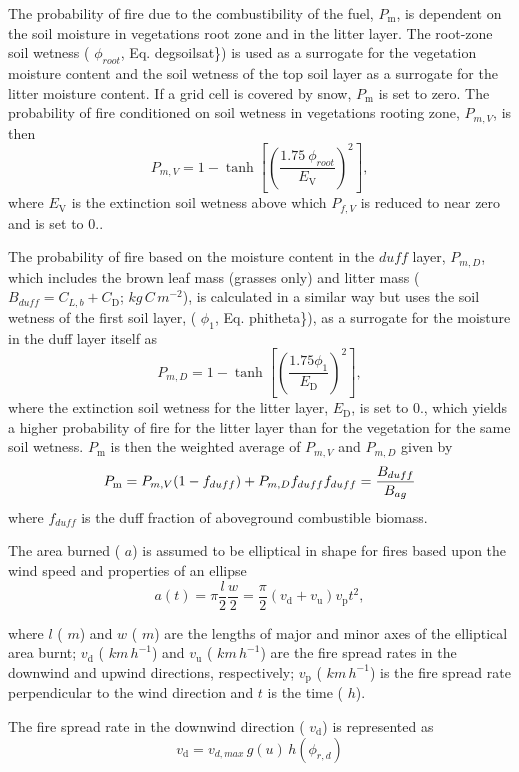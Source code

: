 The probability of fire due to the combustibility of the fuel, $P_\mathrm{m}$, is dependent on the soil moisture in vegetation\textquotesingle{}s root zone and in the litter layer. The root-\/zone soil wetness ( $\phi_{root}$, Eq. degsoilsat\}) is used as a surrogate for the vegetation moisture content and the soil wetness of the top soil layer as a surrogate for the litter moisture content. If a grid cell is covered by snow, $P_\mathrm{m}$ is set to zero. The probability of fire conditioned on soil wetness in vegetation\textquotesingle{}s rooting zone, $P_{m,V}$, is then \[ P_{m,V} = 1-\tanh \left[\left( \frac{1.75\ \phi_{root}} {E_\mathrm{V}}\right )^2\right],\] where $E_\mathrm{V}$ is the extinction soil wetness above which $P_{f,V}$ is reduced to near zero and is set to 0..

The probability of fire based on the moisture content in the $\textit{duff}$ layer, $P_{m,D}$, which includes the brown leaf mass (grasses only) and litter mass ( $B_{duff} = C_{L,b} + C_\mathrm{D}$; $kg\,C\,m^{-2}$), is calculated in a similar way but uses the soil wetness of the first soil layer, ( $\phi_1$, Eq. phitheta\}), as a surrogate for the moisture in the duff layer itself as \[ P_{m,D} = 1 -\tanh\left[\left(\frac{1.75 \phi_1}{E_{\mathrm{D}}}\right)^2\right], \] where the extinction soil wetness for the litter layer, $E_{\mathrm{D}}$, is set to 0., which yields a higher probability of fire for the litter layer than for the vegetation for the same soil wetness. $P_\mathrm{m}$ is then the weighted average of $P_{m,V}$ and $P_{m,D}$ given by \[ \label{eqn:Pf} P_\mathrm{m} = P_{m,V} (1-f_{duff}) + P_{m,D} f_{duff}\nonumber \\ f_{duff}=\frac{B_{duff}}{B_{ag}}\] where $f_{duff}$ is the duff fraction of aboveground combustible biomass.

The area burned ( $a$) is assumed to be elliptical in shape for fires based upon the wind speed and properties of an ellipse \[ a(t)=\pi \frac{l}{2}\frac{w}{2}= \frac{\pi}{2} (v_\mathrm{d}+v_\mathrm{u})v_\mathrm{p}t^2,\]

where $l$ ( $m$) and $w$ ( $m$) are the lengths of major and minor axes of the elliptical area burnt; $v_\mathrm{d}$ ( $km\,h^{-1}$) and $v_\mathrm{u}$ ( $km\,h^{-1}$) are the fire spread rates in the downwind and upwind directions, respectively; $v_\mathrm{p}$ ( $km\,h^{-1}$) is the fire spread rate perpendicular to the wind direction and $t$ is the time ( $h$).

The fire spread rate in the downwind direction ( $v_\mathrm{d}$) is represented as \[ \label{firespreadrate} v_\mathrm{d} = v_{d,max}\,g(u)\,h(\phi_{r, d})\]

